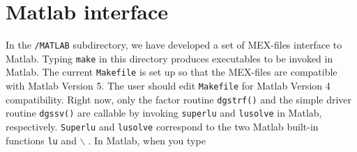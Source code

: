 \section{Matlab interface}
\label{sec:MatlabInterface}
In the {\tt \SuperLU/MATLAB} subdirectory, we have developed a set of 
MEX-files interface to Matlab. Typing {\tt make} in this directory
produces executables to be invoked in Matlab.
The current {\tt Makefile} is set up so that the MEX-files
are compatible with Matlab Version 5. The user should edit
{\tt Makefile} for Matlab Version 4 compatibility.
Right now, only the factor routine {\tt dgstrf()} 
and the simple driver routine {\tt dgssv()} are callable by invoking
{\tt superlu} and {\tt lusolve} in Matlab, respectively. {\tt Superlu} 
and {\tt lusolve} correspond to the two Matlab built-in functions {\tt lu}
and {\tt $\backslash$}$\;$. In Matlab, when you type 

 \hspace{.4in}{\tt help superlu}

